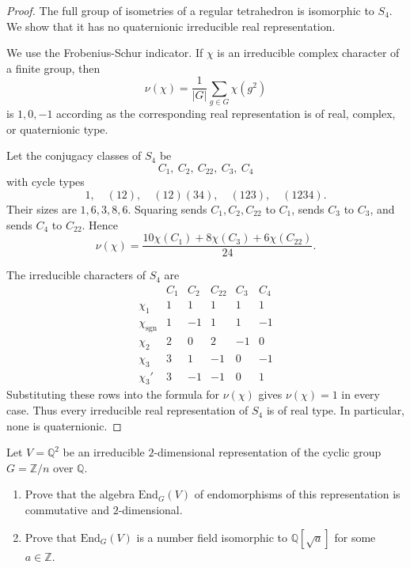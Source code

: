 \begin{proof}
The full group of isometries of a regular
tetrahedron is isomorphic to $S_4$. We show
that it has no quaternionic irreducible real
representation.

We use the Frobenius-Schur indicator. If
$\chi$ is an irreducible complex character
of a finite group, then
$$
\nu(\chi)=
\frac{1}{|G|}\sum_{g\in G}\chi(g^2)
$$
is $1,0,-1$ according as the corresponding
real representation is of real, complex, or
quaternionic type.

Let the conjugacy classes of $S_4$ be
$$
C_1,\ C_2,\ C_{22},\ C_3,\ C_4
$$
with cycle types
$$
1,\quad (12),\quad (12)(34),\quad
(123),\quad (1234).
$$
Their sizes are $1,6,3,8,6$. Squaring sends
$C_1,C_2,C_{22}$ to $C_1$, sends $C_3$ to
$C_3$, and sends $C_4$ to $C_{22}$. Hence
$$
\nu(\chi)=
\frac{10\chi(C_1)+8\chi(C_3)
+6\chi(C_{22})}{24}.
$$

The irreducible characters of $S_4$ are
$$
\begin{array}{c|ccccc}
&C_1&C_2&C_{22}&C_3&C_4\\
\hline
\chi_1&1&1&1&1&1\\
\chi_{\mathrm{sgn}}&1&-1&1&1&-1\\
\chi_2&2&0&2&-1&0\\
\chi_3&3&1&-1&0&-1\\
\chi_3'&3&-1&-1&0&1
\end{array}
$$
Substituting these rows into the formula for
$\nu(\chi)$ gives $\nu(\chi)=1$ in every
case. Thus every irreducible real
representation of $S_4$ is of real type.
In particular, none is quaternionic.
\end{proof}

\begin{exercise}
\label{exercise-cyclic-rational-2d}
Let $V=\mathbb{Q}^2$ be an irreducible
$2$-dimensional representation of the cyclic
group $G=\mathbb{Z}/n$ over $\mathbb{Q}$.
\begin{enumerate}
\item Prove that the algebra
$\text{End}_G(V)$ of endomorphisms of this
representation is commutative and
$2$-dimensional.
\item Prove that $\text{End}_G(V)$ is a
number field isomorphic to
$\mathbb{Q}[\sqrt{a}]$ for some
$a \in \mathbb{Z}$.
\end{enumerate}
\end{exercise}

